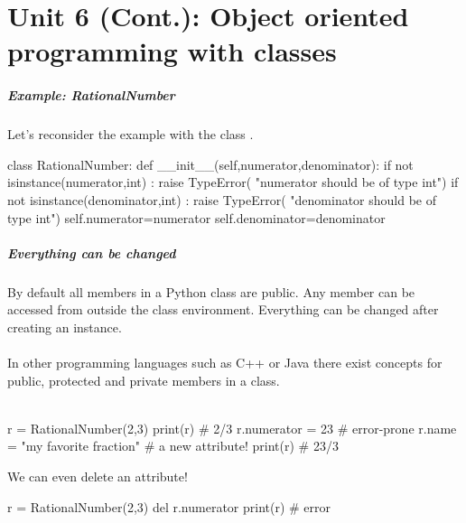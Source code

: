 \documentclass[hyperref={pdfpagelabels=false},table]{beamer}
\begin{document}
\part{Unit 6 (Cont.): Object oriented programming with classes}


\begin{frame}[fragile]\frametitle{Example: RationalNumber}

  Let's reconsider the example with the class .

\begin{python}
class RationalNumber:
    def __init__(self,numerator,denominator):
        if not isinstance(numerator,int) :
             raise TypeError(
                   "numerator should be of type int")
        if not isinstance(denominator,int) :
             raise TypeError(
                   "denominator should be of type int")
        self.numerator=numerator
        self.denominator=denominator
\end{python}

\end{frame}


\begin{frame}[fragile]\frametitle{Everything can be changed}

  By \alert{default} all members in a Python class are \alert{public}. 
  Any member can be accessed from outside the class environment. 
  Everything can be changed after creating an instance. \\ \ \\

  In other programming languages such as C++ or Java there exist 
  concepts for public, protected and private members in a class. \\ \ \\

  \pause

\begin{python}
  r = RationalNumber(2,3)
  print(r)                        # 2/3 
  r.numerator = 23                # error-prone  
  r.name = "my favorite fraction" # a new attribute! 
  print(r)                        # 23/3
\end{python}

\pause

We can even delete an attribute!

\begin{python}
  r = RationalNumber(2,3)
  del r.numerator   
  print(r)                        # error
\end{python}

\end{frame}
\end{document}
